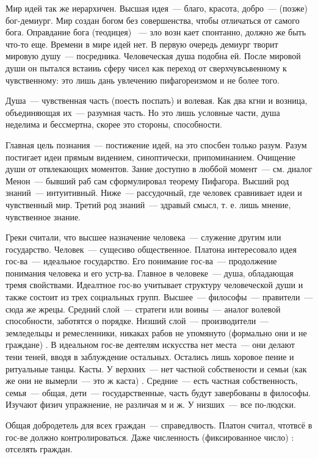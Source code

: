 Мир идей так же иерархичен. Высшая идея~--- благо, красота, добро~--- (позже) бог-демиург. Мир создан богом без совершенства, чтобы отличаться от самого бога. Оправдание бога (теодицея) ~--- зло возн кает спонтанно, должно же быть что-то еще. 
Времени в мире идей нет. В первую очередь демиург творит мировую душу~--- посредника. Человеческая душа подобна ей. 
После мировой души он пытался встаииь сферу чисел как переход от сверхчувсьвенному к чувственному: это лишь дань увлечению пифагореизмом и не более того. 

Душа~--- чувственная часть (поесть поспать) и волевая. Как два кгни и возница, объединяющая их~--- разумная часть. Но это лишь условные части, душа неделима и бессмертна, скорее это стороны, способности. 

Главная цель познания~--- постижение идей, на это спосбен только разум. Разум постигает идеи прямым видением, синоптически, припоминанием. 
Очищение души от отвлекающих моментов. Зание доступно в люббой момент~--- см. диалог Менон~--- бывший раб сам сформулировал теорему Пифагора. 
Высший род знаний~--- интуитивный. Ниже~--- рассудочный, где человек сравнивает идеи и чувственный мир. Третий род знаний~--- здравый смысл, т. е. лишь мнение, чувственное знание. 

Греки считали, что высшее назначение человека~--- служение другим или государство. Человек~--- сущесиво общественное. 
Платона интересовало идея гос-ва~--- идеальное государство. Его понимание гос-ва~--- продолжение понимания человека и его устр-ва. Главное в человеке~--- душа, обладающая тремя свойствами. 
Идеалтное гос-во учитывает структуру человеческой души и также состоит из трех социальных групп. Высшее~--- философы~--- правители~--- сюда же жрецы. Средний слой~--- стратеги или воины~--- аналог волевой способности, заботятся о порядке. 
Низший слой~--- производители~--- земледельцы и ремесленники, никаках рабов не упомянуто (формально они и не граждане) . 
В идеальном гос-ве деятелям искусства нет места~--- они делают тени теней, вводя в заблуждение остальных. Остались лишь хоровое пение и ритуальные танцы. Касты. 
У верхних~--- нет частной собствености и семьи (как же они не вымерли~--- это ж каста) . Средние~--- есть частная собственность, семья~--- общая, дети~--- государственные, часть будут завербованы в философы. 
Изучают физич упражнение, не различая м и ж. 
У низших~--- все по-людски. 

Общая добродетель для всех граждан~--- справедлвость. 
Платон считал, чтотвсё в гос-ве должно контролироваться. Даже численность (фиксированное число) : отселять граждан. 

